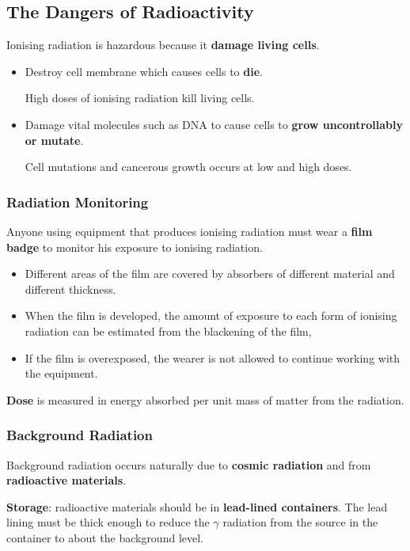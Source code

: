 \subsection{The Dangers of Radioactivity}

Ionising radiation is hazardous because it \textbf{damage living cells}.
\begin{itemize}
    \item Destroy cell membrane which causes cells to \textbf{die}.

        High doses of ionising radiation kill living cells.
    \item Damage vital molecules such as DNA to cause cells to \textbf{grow uncontrollably or mutate}.

        Cell mutations and cancerous growth occurs at low and high doses.
\end{itemize}

\subsubsection*{Radiation Monitoring}

Anyone using equipment that produces ionising radiation must wear a \textbf{film badge} to monitor his exposure to ionising radiation.
\begin{itemize}
    \item Different areas of the film are covered by absorbers of different material and different thickness.
    \item When the film is developed, the amount of exposure to each form of ionising radiation can be estimated from the blackening of the film,
    \item If the film is overexposed, the wearer is not allowed to continue working with the equipment.
\end{itemize}

\textbf{Dose} is measured in energy absorbed per unit mass of matter from the radiation.

\subsubsection*{Background Radiation}

Background radiation occurs naturally due to \textbf{cosmic radiation} and from \textbf{radioactive materials}.

\textbf{Storage}: radioactive materials should be in \textbf{lead-lined containers}. The lead lining must be thick enough to reduce the $\gamma$ radiation from the source in the container to about the background level.

